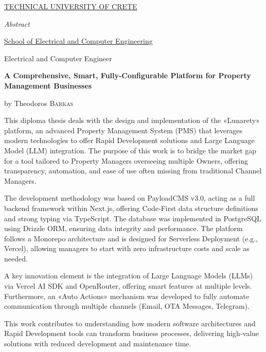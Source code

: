 \documentclass[
	12pt, %
	oneside, %
	greek,
	onehalfspacing, %
	liststotoc, %
	toctotoc, %
	parskip, %
	headsepline, %
]{MastersDoctoralThesis} %
\newcommand{\thesistitleEN}{A Comprehensive, Smart, Fully-Configurable Platform for Property Management Businesses} %
\newcommand{\degreeEN}{Electrical and Computer Engineer} %
\begin{document}
\cleardoublepage
{}
\thispagestyle{plain}
\null\vfill
\begin{center}
	{\normalsize \MakeUppercase{\href{https://www.tuc.gr/}{Technical University of Crete}} \par}
	\bigskip
	{\huge\textit{Abstract} \par}
	\bigskip
	{\normalsize \href{https://www.ece.tuc.gr/}{School of Electrical and Computer Engineering} \par}
	\bigskip
	{\normalsize \degreeEN\par}
	\bigskip
	{\normalsize\bfseries \thesistitleEN \par}
	\medskip
	{\normalsize by Theodoros \textsc{Barkas} \par}
	\bigskip
\end{center}

This diploma thesis deals with the design and implementation of the «Lunarety» platform, an advanced Property Management System (PMS) that leverages modern technologies to offer Rapid Development solutions and Large Language Model (LLM) integration. The purpose of this work is to bridge the market gap for a tool tailored to Property Managers overseeing multiple Owners, offering transparency, automation, and ease of use often missing from traditional Channel Managers.

The development methodology was based on PayloadCMS v3.0, acting as a full backend framework within Next.js, offering Code-First data structure definitions and strong typing via TypeScript. The database was implemented in PostgreSQL using Drizzle ORM, ensuring data integrity and performance. The platform follows a Monorepo architecture and is designed for Serverless Deployment (e.g., Vercel), allowing managers to start with zero infrastructure costs and scale as needed.

A key innovation element is the integration of Large Language Models (LLMs) via Vercel AI SDK and OpenRouter, offering smart features at multiple levels. Furthermore, an «Auto Actions» mechanism was developed to fully automate communication through multiple channels (Email, OTA Messages, Telegram).

This work contributes to understanding how modern software architectures and Rapid Development tools can transform business processes, delivering high-value solutions with reduced development and maintenance time.
\end{document}
